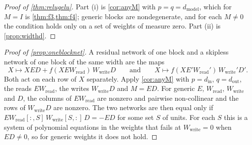 \documentclass[10pt]{article}
\theoremstyle{definition}
\theoremstyle{remark}
\newcommand{\Wread}{W_{\mathrm{read}}}
\newcommand{\Wwrite}{W_{\mathrm{write}}}
\newcommand{\dm}{d_{\mathrm{model}}}
\begin{document}
\thmAbsorbReLU*

\begin{proof}[Proof of \cref{thm:relugelu}]
Part (i) is \cref{cor:anyM} with $p = q = \dm$, which for $M = I$ is \cref{thm:f3,thm:f4}; generic blocks are nondegenerate, and for each $M \neq 0$ the condition holds only on a set of weights of measure zero. Part (ii) is \cref{prop:widthd}.
\end{proof}

\propOneBlockNet*

\begin{proof}[Proof of \cref{prop:oneblocknet}]
A residual network of one block and a skipless network of one block of the same width are the maps
\[
X \mapsto XED + f(XE\Wread)\,\Wwrite D \qquad\text{and}\qquad X \mapsto f(XE'\Wread')\,\Wwrite' D' .
\]
Both act on each row of $X$ separately. Apply \cref{cor:anyM} with $p = d_{\mathrm{in}}$, $q = d_{\mathrm{out}}$, the reads $E\Wread$, the writes $\Wwrite D$ and $M = ED$. For generic $E$, $\Wread$, $\Wwrite$ and $D$, the columns of $E\Wread$ are nonzero and pairwise non-collinear and the rows of $\Wwrite D$ are nonzero. The two networks are then equal only if $E\Wread[{:},S]\,\Wwrite[S,{:}]\,D = -ED$ for some set $S$ of units. For each $S$ this is a system of polynomial equations in the weights that fails at $\Wwrite = 0$ when $ED \neq 0$, so for generic weights it does not hold.
\end{proof}


\thmAbsorbFirst*
\end{document}
